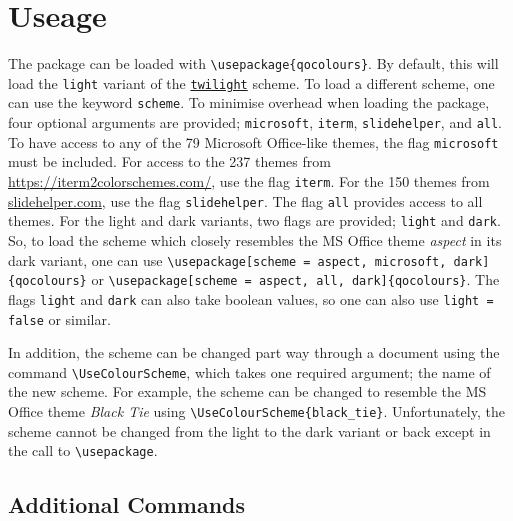 \documentclass[]{article}
\begin{document}
  \section{Useage}

  The package can be loaded with \verb|\usepackage{qocolours}|. By default, this will load the \texttt{light} variant of the \hyperref[section:default]{\texttt{twilight}} scheme. To load a different scheme, one can use the keyword \texttt{scheme}. To minimise overhead when loading the package, four optional arguments are provided; \texttt{microsoft}, \texttt{iterm}, \texttt{slidehelper}, and \texttt{all}. To have access to any of the 79 Microsoft Office-like themes, the flag \texttt{microsoft} must be included. For access to the 237 themes from \href{https://iterm2colorschemes.com/}{https://iterm2colorschemes.com/}, use the flag \texttt{iterm}. For the 150 themes from \href{https://slidehelper.com/blog/150-custom-color-palettes-for-powerpoint-word-and-excel/}{slidehelper.com}, use the flag \texttt{slidehelper}. The flag \texttt{all} provides access to all themes. For the light and dark variants, two flags are provided; \texttt{light} and \texttt{dark}. So, to load the scheme which closely resembles the MS Office theme \textit{aspect} in its dark variant, one can use \verb|\usepackage[scheme = aspect, microsoft, dark]{qocolours}| or \verb|\usepackage[scheme = aspect, all, dark]{qocolours}|. The flags \texttt{light} and \texttt{dark} can also take boolean values, so one can also use \verb|light = false| or similar.

  In addition, the scheme can be changed part way through a document using the command \verb|\UseColourScheme|, which takes one required argument; the name of the new scheme. For example, the scheme can be changed to resemble the MS Office theme \textit{Black Tie} using \verb|\UseColourScheme{black_tie}|. Unfortunately, the scheme cannot be changed from the light to the dark variant or back except in the call to \verb|\usepackage|.

  \subsection{Additional Commands}
\end{document}
